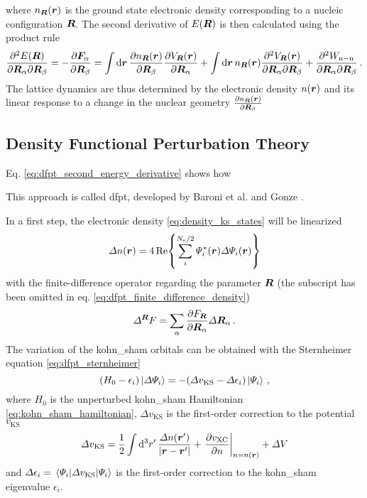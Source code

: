 \documentclass[main.tex]{subfiles}
\begin{document}
where \(n_{\vb*{R}} (\vb*{r})\) is the ground state electronic density corresponding to a nucleic configuration \(\vb*{R}\).
The second derivative of \(E(\vb*{R})\) is then calculated using the product rule
\begin{equation}\label{eq:dfpt_second_energy_derivative}
    \pdv{E(\vb*{R})}{\vb*{R}_{\alpha}}{\vb*{R}_{\beta}} = - \pdv{\vb*{F}_{\alpha}}{\vb*{R}_{\beta}} = \int \dd{\vb*{r}} \pdv{n_{\vb*{R}} (\vb*{r})}{\vb*{R}_{\beta}}  \pdv{V_{\vb*{R}} (\vb*{r})}{\vb*{R}_{\alpha}}
    + \int \dd{\vb*{r}} n_{\vb*{R}} (\vb*{r}) \pdv{V_{\vb*{R}} (\vb*{r})}{\vb*{R}_{\alpha}}{\vb*{R}_{\beta}}
    + \pdv{W_{\mathrm{n-n}}}{\vb*{R}_{\alpha}}{\vb*{R}_{\beta}} \,.
\end{equation}
The lattice dynamics are thus determined by the electronic density \(n(\vb*{r})\) and its linear response to a change in the nuclear geometry \(\pdv{n_{\vb*{R}} (\vb*{r})}{\vb*{R}_{\beta}}\)

\subsection{Density Functional Perturbation Theory}

Eq. \ref{eq:dfpt_second_energy_derivative} shows how

This approach is called \acrfull{dfpt}, developed by Baroni et al. \cite{baroni_greens-function_1987} and Gonze \cite{gonze_adiabatic_1995}.

In a first step, the electronic density \ref{eq:density_ks_states} will be linearized
\begin{equation}\label{eq:dfpt_finite_difference_density}
    \Delta n(\vb*{r}) = 4 \Re{\sum_i^{N_{\mathrm{e}} / 2} \Psi_i^* (\vb*{r}) \Delta \Psi_i (\vb*{r})}
\end{equation}
with the finite-difference operator regarding the parameter \(\vb*{R}\) (the subscript has been omitted in eq. \ref{eq:dfpt_finite_difference_density})
\begin{equation}
    \Delta^{\vb*{R}} F = \sum_{\alpha} \pdv{F_{\vb*{R}}}{\vb*{R}_{\alpha}} \Delta \vb*{R}_{\alpha}\,.
\end{equation}
The variation of the \acrshort{kohn_sham} orbitals can be obtained with the Sternheimer equation \ref{eq:dfpt_sternheimer}
\begin{equation}
    (H_0 - \epsilon_i) \ket{\Delta \Psi_i} = - (\Delta v_{\mathrm{KS}} - \Delta \epsilon_i) \ket{\Psi_i}\,,
\end{equation}
where \(H_0\) is the unperturbed \acrshort{kohn_sham} Hamiltonian \ref{eq:kohn_sham_hamiltonian}, \(\Delta v_{\mathrm{KS}}\) is the first-order correction to the potential \(v_{\mathrm{KS}}\)
\begin{equation}
    \Delta v_{\mathrm{KS}} = \frac{1}{2} \int \dd[3]{r^{\prime}} \frac{\Delta n(\vb*{r}^{\prime})}{\vert \vb*{r} - \vb*{r}^{\prime} \vert} + \left. \pdv{v_{\mathrm{XC}}}{n} \right\vert_{n = n(\vb*{r})} + \Delta V
\end{equation}
and \(\Delta \epsilon_i = \expval{\Delta v_{\mathrm{KS}}}{\Psi_i}\) is the first-order correction to the \acrshort{kohn_sham} eigenvalue \(\epsilon_i\).

\end{document}
